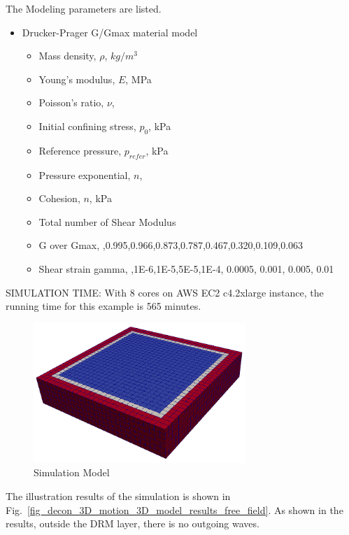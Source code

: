 The Modeling parameters are listed.
\begin{itemize}
  \item Drucker-Prager G/Gmax material model 
  \begin{itemize}
    \item Mass density, $\rho$, \enspace {} $kg/m^3$
    \item Young's modulus, $E$, \enspace {} MPa
    \item Poisson's ratio, $\nu$, \enspace {}
    \item Initial confining stress, $p_0$, \enspace {} kPa
    \item Reference pressure, $p_{refer} $, \enspace {} kPa
    \item Pressure exponential, $ n  $, \enspace {}
    \item Cohesion, $ n  $, \enspace {} kPa
    \item Total number of Shear Modulus \enspace {}
    \item G over Gmax, \enspace {},0.995,0.966,0.873,0.787,0.467,0.320,0.109,0.063
    \item Shear strain gamma, \enspace {},1E-6,1E-5,5E-5,1E-4, 0.0005, 0.001, 0.005, 0.01
  \end{itemize}
\end{itemize}


SIMULATION TIME: With 8 cores on AWS EC2 c4.2xlarge instance, the running time for this example is 565 minutes.




\begin{figure}[H]
  \centering
  \includegraphics[width = 8cm]{./Figure-files/nonlinear_analysis_steps/free_field_3D/overview.png}
  \caption{Simulation Model}
  \label{fig_nonlinear_motion_3D_model}
\end{figure}

The illustration results of the simulation is shown in Fig.~\ref{fig_decon_3D_motion_3D_model_results_free_field}.
As shown in the results, outside the DRM layer, there is no outgoing waves. 

